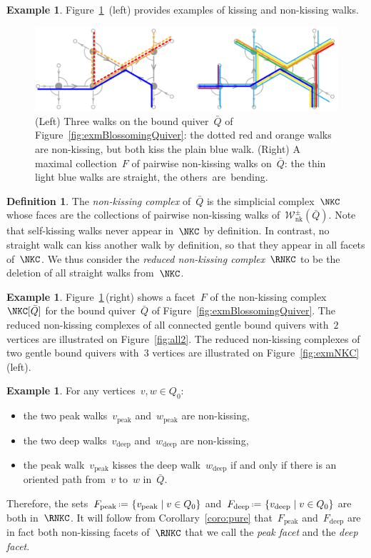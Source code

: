 \documentclass{amsart}
\theoremstyle{definition}
\newtheorem{definition}[theorem]{Definition}
\newtheorem{example}[theorem]{Example}
\newcommand{\set}[2]{\left\{ #1 \;\middle|\; #2 \right\}} %
\newcommand{\eqdef}{\mbox{\,\raisebox{0.2ex}{\scriptsize\ensuremath{\mathrm:}}\ensuremath{=}\,}} %
\newcommand{\fref}[1]{Figure~\ref{#1}} %
\newcommand{\darkblue}{\color{darkblue}} %
\newcommand{\defn}[1]{\textsl{\darkblue #1}} %
\newcommand{\NKWalks}{\mathcal{W}_\mathrm{nk}} %
\newcommand{\peak}{\mathrm{peak}} %
\newcommand{\deep}{\mathrm{deep}} %
\begin{document}
\begin{example}
\fref{fig:exmFacet}~(left) provides examples of kissing and non-kissing walks.
%
\begin{figure}[t]
	\capstart
	\centerline{\includegraphics[scale=.7]{exmFacet}}
	\caption{(Left) Three walks on the bound quiver~$\bar Q$ of \fref{fig:exmBlossomingQuiver}: the dotted red and orange walks are non-kissing, but both kiss the plain blue walk. (Right) A maximal collection~$F$ of pairwise non-kissing walks on~$\bar Q$: the thin light blue walks are straight, the others~are~bending.}
	\label{fig:exmFacet}
\end{figure}
\end{example}

\begin{definition}\label{def: nKc}
The \defn{non-kissing complex} of~$\bar Q$ is the simplicial complex~$\NKC$ whose faces are the collections of pairwise non-kissing walks of~$\NKWalks^\pm(\bar Q)$.
Note that self-kissing walks never appear in~$\NKC$ by definition.
In contrast, no straight walk can kiss another walk by definition, so that they appear in all facets of~$\NKC$.
We thus consider the \defn{reduced non-kissing complex}~$\RNKC$ to be the deletion of all straight walks from~$\NKC$.
\end{definition}

\begin{example}
\fref{fig:exmFacet}\,(right) shows a facet~$F$ of the non-kissing complex~$\NKC[\bar Q]$ for the bound quiver~$\bar Q$ of \fref{fig:exmBlossomingQuiver}.
The reduced non-kissing complexes of all connected gentle bound quivers with~$2$ vertices are illustrated on \fref{fig:all2}.
The reduced non-kissing complexes of two gentle bound quivers with~$3$ vertices are illustrated on \fref{fig:exmNKC}\,(left).
\end{example}

\begin{example}\label{example: Fdeep Fpeak}
For any vertices~$v,w \in Q_0$:
\begin{itemize}
\item the two peak walks~$v_\peak$ and~$w_\peak$ are non-kissing,
\item the two deep walks~$v_\deep$ and~$w_\deep$ are non-kissing,
\item the peak walk~$v_\peak$ kisses the deep walk~$w_\deep$ if and only if there is an oriented path from~$v$ to~$w$ in~$\bar Q$.
\end{itemize}
Therefore, the sets~$F_\peak \eqdef \set{v_\peak}{v \in Q_0}$ and~$F_\deep \eqdef \set{v_\deep}{v \in Q_0}$ are both in~$\RNKC$.
It will follow from Corollary~\ref{coro:pure} that~$F_\peak$ and~$F_\deep$ are in fact both non-kissing facets of~$\RNKC$ that we call the \defn{peak facet} and the \defn{deep facet}.
\end{example}
\end{document}
